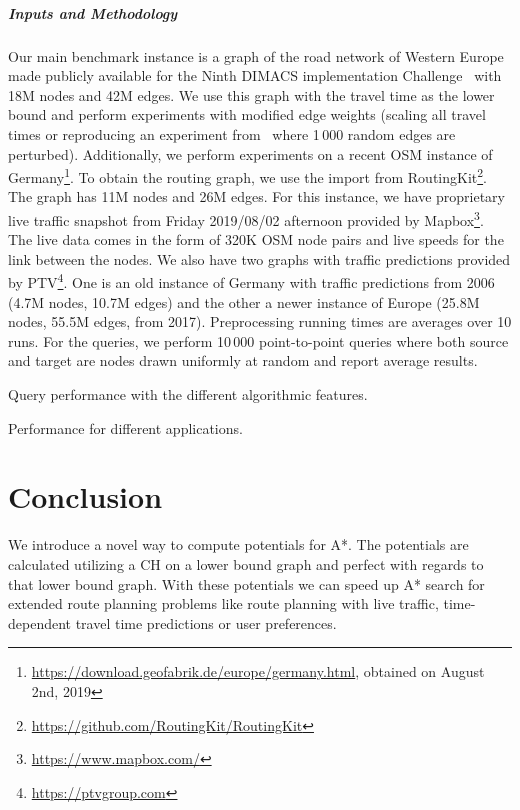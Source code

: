 \documentclass[letterpaper]{article} %
\begin{document}
\subparagraph{Inputs and Methodology}
Our main benchmark instance is a graph of the road network of Western Europe made publicly available for the Ninth DIMACS implementation Challenge~\cite{DemetrescuGJ09} with 18M nodes and 42M edges.
We use this graph with the travel time as the lower bound and perform experiments with modified edge weights (scaling all travel times or reproducing an experiment from~\cite{dw-lbrdg-07} where 1\,000 random edges are perturbed).
Additionally, we perform experiments on a recent OSM instance of Germany\footnote{\url{https://download.geofabrik.de/europe/germany.html}, obtained on August 2nd, 2019}.
To obtain the routing graph, we use the import from RoutingKit\footnote{\url{https://github.com/RoutingKit/RoutingKit}}.
The graph has 11M nodes and 26M edges.
For this instance, we have proprietary live traffic snapshot from Friday 2019/08/02 afternoon provided by Mapbox\footnote{\url{https://www.mapbox.com/}}.
The live data comes in the form of 320K OSM node pairs and live speeds for the link between the nodes.
We also have two graphs with traffic predictions provided by PTV\footnote{\url{https://ptvgroup.com}}.
One is an old instance of Germany with traffic predictions from 2006 (4.7M nodes, 10.7M edges) and the other a newer instance of Europe (25.8M nodes, 55.5M edges, from 2017).
Preprocessing running times are averages over 10 runs.
For the queries, we perform 10\,000 point-to-point queries where both source and target are nodes drawn uniformly at random and report average results.

\begin{table}
\centering
\caption{Query performance with the different algorithmic features.}\label{tab:building_blocks}

\end{table}

\begin{table}
\centering
\caption{Performance for different applications.}\label{tab:applications}

\end{table}

\section{Conclusion}
\label{sec:conclusion}

We introduce a novel way to compute potentials for A*.
The potentials are calculated utilizing a CH on a lower bound graph and perfect with regards to that lower bound graph.
With these potentials we can speed up A* search for extended route planning problems like route planning with live traffic, time-dependent travel time predictions or user preferences.



\pagebreak



\end{document}
